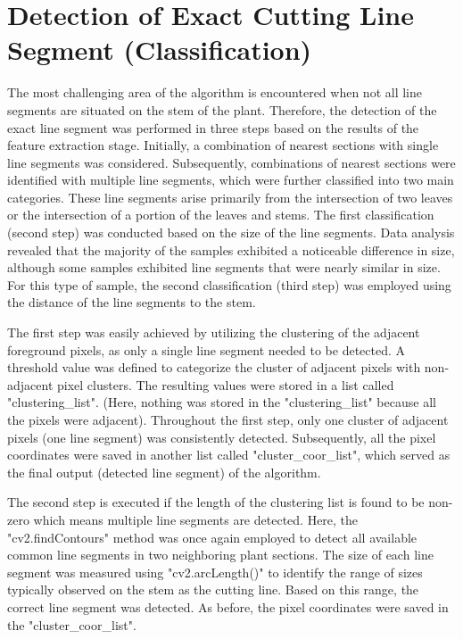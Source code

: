 \documentclass[]{iat}
\begin{document}
\section{Detection of Exact Cutting Line Segment (Classification)}

The most challenging area of the algorithm is encountered when not all line segments are situated on the stem of the plant. Therefore, the detection of the exact line segment was performed in three steps based on the results of the feature extraction stage. Initially, a combination of nearest sections with single line segments was considered. Subsequently, combinations of nearest sections were identified with multiple line segments, which were further classified into two main categories. These line segments arise primarily from the intersection of two leaves or the intersection of a portion of the leaves and stems. The first classification (second step) was conducted based on the size of the line segments. Data analysis revealed that the majority of the samples exhibited a noticeable difference in size, although some samples exhibited line segments that were nearly similar in size. For this type of sample, the second classification (third step) was employed using the distance of the line segments to the stem.
\par
The first step was easily achieved by utilizing the clustering of the adjacent foreground pixels, as only a single line segment needed to be detected. A threshold value was defined to categorize the cluster of adjacent pixels with non-adjacent pixel clusters. The resulting values were stored in a list called "clustering\_list". (Here, nothing was stored in the "clustering\_list" because all the pixels were adjacent).  Throughout the first step, only one cluster of adjacent pixels (one line segment) was consistently detected. Subsequently, all the pixel coordinates were saved in another list called "cluster\_coor\_list", which served as the final output (detected line segment) of the algorithm.
\par
The second step is executed if the length of the clustering list is found to be non-zero which means multiple line segments are detected. Here, the "cv2.findContours" method was once again employed to detect all available common line segments in two neighboring plant sections. The size of each line segment was measured using "cv2.arcLength()" to identify the range of sizes typically observed on the stem as the cutting line. Based on this range, the correct line segment was detected. As before, the pixel coordinates were saved in the "cluster\_coor\_list".
\end{document}
